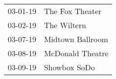 \begin{supertabular}{p{0.25\columnwidth}p{0.75\columnwidth}}
 03-01-19 &   The Fox Theater \\
 03-02-19 &       The Wiltern \\
 03-07-19 &  Midtown Ballroom \\
 03-08-19 &  McDonald Theatre \\
 03-09-19 &      Showbox SoDo \\
\end{supertabular}
